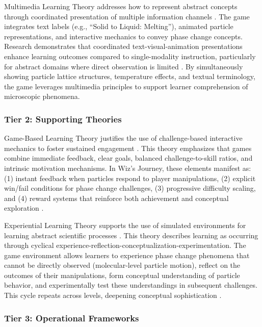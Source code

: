 Multimedia Learning Theory addresses how to represent abstract concepts through coordinated presentation of multiple information channels \cite{Mayer2001, Mayer2009}. The game integrates text labels (e.g., ``Solid to Liquid: Melting''), animated particle representations, and interactive mechanics to convey phase change concepts. Research demonstrates that coordinated text-visual-animation presentations enhance learning outcomes compared to single-modality instruction, particularly for abstract domains where direct observation is limited \cite{MayerMoreno2002}. By simultaneously showing particle lattice structures, temperature effects, and textual terminology, the game leverages multimedia principles to support learner comprehension of microscopic phenomena.

\subsubsection{Tier 2: Supporting Theories}

Game-Based Learning Theory justifies the use of challenge-based interactive mechanics to foster sustained engagement \cite{Prensky2001, Gee2003}. This theory emphasizes that games combine immediate feedback, clear goals, balanced challenge-to-skill ratios, and intrinsic motivation mechanisms. In Wiz's Journey, these elements manifest as: (1) instant feedback when particles respond to player manipulations, (2) explicit win/fail conditions for phase change challenges, (3) progressive difficulty scaling, and (4) reward systems that reinforce both achievement and conceptual exploration \cite{Prensky2001}.

Experiential Learning Theory supports the use of simulated environments for learning abstract scientific processes \cite{Kolb1984}. This theory describes learning as occurring through cyclical experience-reflection-conceptualization-experimentation. The game environment allows learners to experience phase change phenomena that cannot be directly observed (molecular-level particle motion), reflect on the outcomes of their manipulations, form conceptual understanding of particle behavior, and experimentally test these understandings in subsequent challenges. This cycle repeats across levels, deepening conceptual sophistication \cite{Kolb1984}.

\subsubsection{Tier 3: Operational Frameworks}


